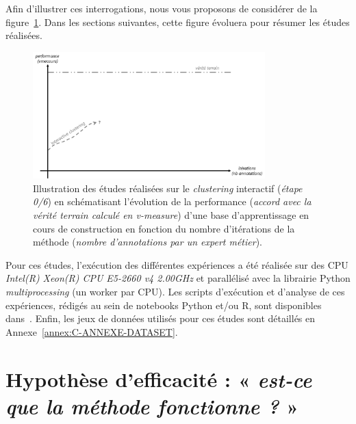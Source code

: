 	Afin d'illustrer ces interrogations, nous vous proposons de considérer de la figure~\ref{figure:HYPOTHESE-00-DEFAULT}. Dans les sections suivantes, cette figure évoluera pour résumer les études réalisées.
	\begin{figure}[H]
		\centering
		\includegraphics[width=0.8\textwidth]{figures/hypotheses-00-default}
		\caption{Illustration des études réalisées sur le \textit{clustering} interactif (\textit{étape 0/6}) en schématisant l'évolution de la performance (\textit{accord avec la vérité terrain calculé en v-measure}) d'une base d'apprentissage en cours de construction en fonction du nombre d'itérations de la méthode (\textit{nombre d'annotations par un expert métier}).}
		\label{figure:HYPOTHESE-00-DEFAULT}
	\end{figure}
	
	Pour ces études, l'exécution des différentes expériences a été réalisée sur des CPU \textit{Intel(R) Xeon(R) CPU E5-2660 v4 \@ 2.00GHz} et parallélisé avec la librairie Python \textit{multiprocessing} (un worker par CPU).
	Les scripts d'exécution et d'analyse de ces expériences, rédigés au sein de notebooks Python et/ou R, sont disponibles dans~\cite{schild:cognitivefactory-interactive-clustering-comparative-study:2021}.
	Enfin, les jeux de données utilisés pour ces études sont détaillés en Annexe~\ref{annex:C-ANNEXE-DATASET}.
	
	
    \minitoc

    \section{Hypothèse d'efficacité : « \textit{est-ce que la méthode fonctionne ?} »}
	\label{section:4.1-HYPOTHESE-EFFICACITE}
	

